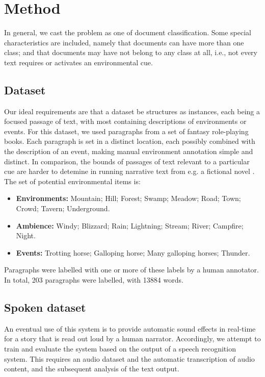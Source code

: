 \documentclass[10pt,a4paper]{article}
\begin{document}
\section{Method}

In general, we cast the problem as one of document classification.
Some special characteristics are included, namely that documents can have more than one class; and that documents may have not belong to any class at all, i.e., not every text requires or activates an environmental cue.

\subsection{Dataset}
Our ideal requirements are that a dataset be structures as instances, each being a focused passage of text, with most containing descriptions of environments or events.
For this dataset, we used paragraphs from a set of fantasy role-playing books.%
Each paragraph is set in a distinct location, each possibly combined with the description of an event, making manual environment annotation simple and distinct.
In comparison, the bounds of passages of text relevant to a particular cue are harder to detemine in running narrative text from e.g. a fictional novel .
The set of potential environmental items is:

\begin{itemize}
\item {\bf Environments:} Mountain; Hill; Forest; Swamp; Meadow; Road; Town; Crowd; Tavern; Underground.
\item {\bf Ambience:} Windy; Blizzard; Rain; Lightning; Stream; River; Campfire; Night.
\item {\bf Events:} Trotting horse; Galloping horse; Many galloping horses; Thunder.
\end{itemize}

Paragraphs were labelled with one or more of these labels by a human annotator.
In total, 203 paragraphs were labelled, with 13884 words.

\subsection{Spoken dataset}
An eventual use of this system is to provide automatic sound effects in real-time for a story that is read out loud by a human narrator.
Accordingly, we attempt to train and evaluate the system based on the output of a speech recognition system.
This requires an audio dataset and the automatic transcription of audio content, and the subsequent analysis of the text output.
\end{document}
